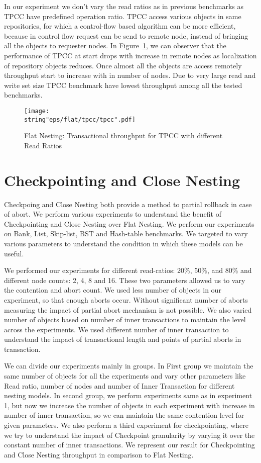 \documentclass[12pt,english]{report}
\begin{document}
In our experiment we don't vary the read ratios as in previous benchmarks as TPCC have predefined operation ratio. TPCC access various objects in same repositories, for which a control-flow based algorithm can be more efficient, because in control flow request can be send to remote node, instead of bringing all the objects to requester nodes. In Figure~\ref{Fig:flatTPCC}, we can observer that the performance of TPCC at start drops with increase in remote nodes as localization of repository objects reduces. Once almost all the objects are access remotely throughput start to increase with in number of nodes. Due to very large read and write set size TPCC benchmark have lowest throughput among all the tested benchmarks.

\begin{figure}[H]
\centering
\texttt{[image: \\string"eps/flat/tpcc/tpcc".pdf]}
\caption{Flat Nesting: Transactional throughput for TPCC with different Read Ratios}
\label{Fig:flatTPCC}
\end{figure}

\section{Checkpointing and Close Nesting}

Checkpoing and Close Nesting both provide a method to partial rollback in case of abort. We perform various experiments to understand the benefit of Checkpointing and Close Nesting over Flat Nesting. We perform our experiments on Bank, List, Skip-list, BST and Hash-table benchmarks. We targeted to vary various parameters to understand the condition in which these models can be useful.

We performed our experiments for different read-ratios: 20\%, 50\%, and 80\% and different node counts: 2, 4, 8 and 16. These two parameters allowed us to vary the contention and abort count. We used less number of objects in our experiment, so that enough aborts occur. Without significant number of aborts measuring the impact of partial abort mechanism is not possible. We also varied number of objects based on number of inner transactions to maintain the level across the experiments. We used different number of inner transaction to understand the impact of transactional length and points of partial aborts in transaction.

We can divide our experiments mainly in groups. In First group we maintain the same number of objects for all the experiments and vary other parameters like Read ratio, number of nodes and number of Inner Transaction for different nesting models. In second group, we perform experiments same as in experiment 1, but now we increase the number of objects in each experiment with increase in number of inner transaction, so we can maintain the same contention level for given parameters. We also perform a third experiment for checkpointing, where we try to understand the impact of Checkpoint granularity by varying it over the constant number of inner transactions. We represent our result for Checkpointing and Close Nesting throughput in comparison to Flat Nesting.
\end{document}
